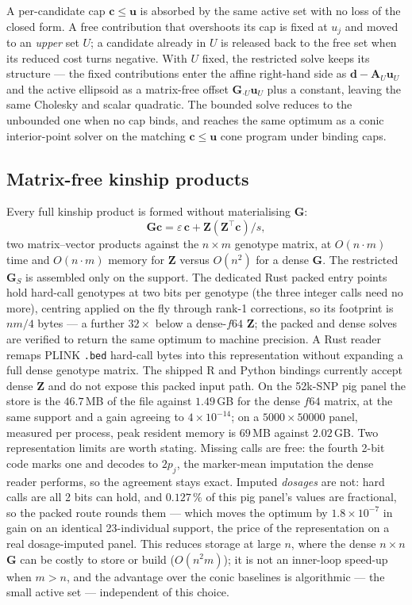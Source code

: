 \documentclass[11pt]{article}
\newcommand{\tp}{^{\top}}
\newcommand{\bc}{\mathbf{c}}
\newcommand{\bG}{\mathbf{G}}
\newcommand{\bZ}{\mathbf{Z}}
\newcommand{\bA}{\mathbf{A}}
\newcommand{\bd}{\mathbf{d}}
\newcommand{\bu}{\mathbf{u}}
\begin{document}
A per-candidate cap $\bc\le\bu$ is absorbed by the same active set with no loss of the closed form. A free contribution that overshoots its cap is fixed at $u_j$ and moved to an \emph{upper} set $U$; a candidate already in $U$ is released back to the free set when its reduced cost turns negative. With $U$ fixed, the restricted solve keeps its structure --- the fixed contributions enter the affine right-hand side as $\bd-\bA_U\bu_U$ and the active ellipsoid as a matrix-free offset $\bG_{\cdot U}\bu_U$ plus a constant, leaving the same Cholesky and scalar quadratic. The bounded solve reduces to the unbounded one when no cap binds, and reaches the same optimum as a conic interior-point solver on the matching $\bc\le\bu$ cone program under binding caps.

\subsection{Matrix-free kinship products}

Every full kinship product is formed without materialising $\bG$:
\[
  \bG\bc = \varepsilon\,\bc + \bZ(\bZ\tp\bc)/s,
\]
two matrix--vector products against the $n\times m$ genotype matrix, at $O(n\cdot m)$ time and $O(n\cdot m)$ memory for $\bZ$ versus $O(n^2)$ for a dense $\bG$. The restricted $\bG_S$ is assembled only on the support. The dedicated Rust packed entry points hold hard-call genotypes at two bits per genotype (the three integer calls need no more), centring applied on the fly through rank-1 corrections, so its footprint is $nm/4$ bytes --- a further $32\times$ below a dense-$f64$ $\bZ$; the packed and dense solves are verified to return the same optimum to machine precision. A Rust reader remaps PLINK \texttt{.bed} hard-call bytes into this representation without expanding a full dense genotype matrix. The shipped R and Python bindings currently accept dense $\bZ$ and do not expose this packed input path. On the 52k-SNP pig panel the store is the $46.7$\,MB of the file against $1.49$\,GB for the dense $f64$ matrix, at the same support and a gain agreeing to $4\times10^{-14}$; on a $5000\times50000$ panel, measured per process, peak resident memory is $69$\,MB against $2.02$\,GB. Two representation limits are worth stating. Missing calls are free: the fourth 2-bit code marks one and decodes to $2p_j$, the marker-mean imputation the dense reader performs, so the agreement stays exact. Imputed \emph{dosages} are not: hard calls are all 2 bits can hold, and $0.127\,\%$ of this pig panel's values are fractional, so the packed route rounds them --- which moves the optimum by $1.8\times10^{-7}$ in gain on an identical 23-individual support, the price of the representation on a real dosage-imputed panel. This reduces storage at large $n$, where the dense $n\times n$ $\bG$ can be costly to store or build ($O(n^2 m)$); it is not an inner-loop speed-up when $m>n$, and the advantage over the conic baselines is algorithmic --- the small active set --- independent of this choice.
\end{document}
